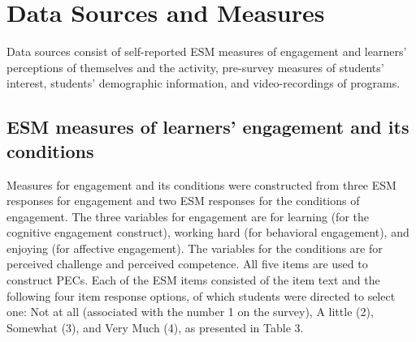 \documentclass[]{book}
\theoremstyle{definition}
\theoremstyle{definition}
\theoremstyle{definition}
\theoremstyle{remark}
\begin{document}
\section{Data Sources and Measures}\label{data-sources-and-measures}

Data sources consist of self-reported ESM measures of engagement and
learners' perceptions of themselves and the activity, pre-survey
measures of students' interest, students' demographic information, and
video-recordings of programs.

\subsection{ESM measures of learners' engagement and its
conditions}\label{esm-measures-of-learners-engagement-and-its-conditions}

Measures for engagement and its conditions were constructed from three
ESM responses for engagement and two ESM responses for the conditions of
engagement. The three variables for engagement are for learning (for the
cognitive engagement construct), working hard (for behavioral
engagement), and enjoying (for affective engagement). The variables for
the conditions are for perceived challenge and perceived competence. All
five items are used to construct PECs. Each of the ESM items consisted
of the item text and the following four item response options, of which
students were directed to select one: Not at all (associated with the
number 1 on the survey), A little (2), Somewhat (3), and Very Much (4),
as presented in Table 3.

\begin{table}

\caption{\label{tab:unnamed-chunk-5}ESM measures for profiles of engagement and its conditions (PECs)}
\centering
{}
\end{table}
\end{document}
